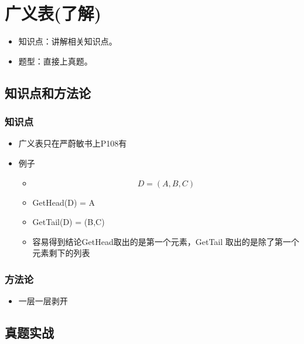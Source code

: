 \chapter{广义表(了解)}
\label{chap4}

\begin{itemize}[noitemsep,topsep=0pt,parsep=0pt,partopsep=0pt]
	\item 知识点：讲解相关知识点。
	\item 题型：直接上真题。
\end{itemize}

\section{知识点和方法论}

\subsection{知识点}
\begin{itemize}[noitemsep,topsep=0pt,parsep=0pt,partopsep=0pt]
	\item 广义表只在严蔚敏书上P108有
	\item 例子
	\begin{itemize}[noitemsep,topsep=0pt,parsep=0pt,partopsep=0pt]
	\item $$ D = (A,B,C)$$
	\item GetHead(D) = A
	\item GetTail(D) = (B,C)
	\item 容易得到结论GetHead取出的是第一个{\color{red}元素}，GetTail 取出的是除了第一个元素剩下的{\color{red}列表}
	\end{itemize}
\end{itemize}

\subsection{方法论}

\begin{itemize}[noitemsep,topsep=0pt,parsep=0pt,partopsep=0pt]
	\item 一层一层剥开
\end{itemize}

\section{真题实战}

